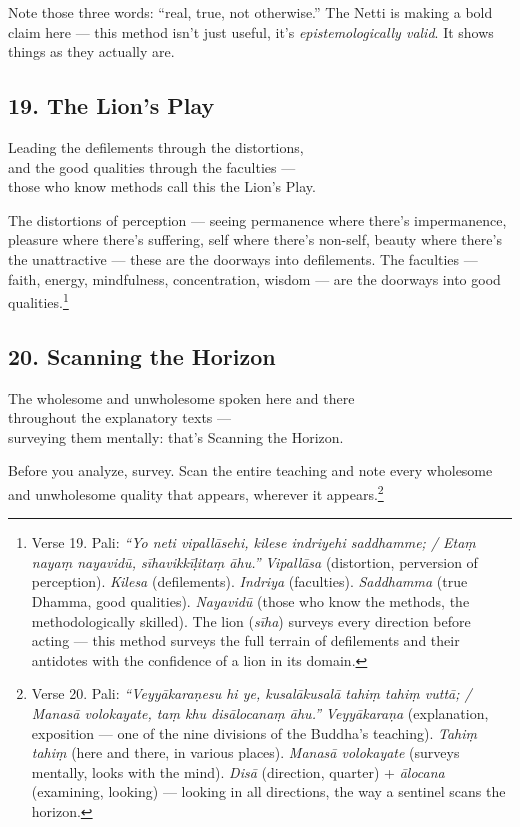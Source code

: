 Note those three words: ``real, true, not otherwise.'' The Netti is making a bold claim here --- this method isn't just useful, it's \textit{epistemologically valid}. It shows things as they actually are.

\subsection*{19. The Lion's Play}

\begin{versebox}
Leading the defilements through the distortions,\\
and the good qualities through the faculties ---\\
those who know methods call this the Lion's Play.
\end{versebox}

The distortions of perception --- seeing permanence where there's impermanence, pleasure where there's suffering, self where there's non-self, beauty where there's the unattractive --- these are the doorways into defilements. The faculties --- faith, energy, mindfulness, concentration, wisdom --- are the doorways into good qualities.\footnote{Verse 19. Pali: \textit{``Yo neti vipallāsehi, kilese indriyehi saddhamme; / Etaṃ nayaṃ nayavidū, sīhavikkīḷitaṃ āhu.''} \textit{Vipallāsa} (distortion, perversion of perception). \textit{Kilesa} (defilements). \textit{Indriya} (faculties). \textit{Saddhamma} (true Dhamma, good qualities). \textit{Nayavidū} (those who know the methods, the methodologically skilled). The lion (\textit{sīha}) surveys every direction before acting --- this method surveys the full terrain of defilements and their antidotes with the confidence of a lion in its domain.}

\subsection*{20. Scanning the Horizon}

\begin{versebox}
The wholesome and unwholesome spoken here and there\\
throughout the explanatory texts ---\\
surveying them mentally: that's Scanning the Horizon.
\end{versebox}

Before you analyze, survey. Scan the entire teaching and note every wholesome and unwholesome quality that appears, wherever it appears.\footnote{Verse 20. Pali: \textit{``Veyyākaraṇesu hi ye, kusalākusalā tahiṃ tahiṃ vuttā; / Manasā volokayate, taṃ khu disālocanaṃ āhu.''} \textit{Veyyākaraṇa} (explanation, exposition --- one of the nine divisions of the Buddha's teaching). \textit{Tahiṃ tahiṃ} (here and there, in various places). \textit{Manasā volokayate} (surveys mentally, looks with the mind). \textit{Disā} (direction, quarter) + \textit{ālocana} (examining, looking) --- looking in all directions, the way a sentinel scans the horizon.}

